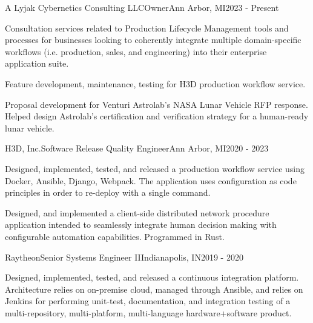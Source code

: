 



\begin{cventries}


  \cventry
  {A Lyjak Cybernetics Consulting LLC}{Owner}{Ann Arbor, MI}{2023 - Present}
  {
    \begin{cvitems}
    \item Consultation services related to Production Lifecycle Management tools and processes for
      businesses looking to coherently integrate multiple domain-specific workflows
      (i.e. production, sales, and engineering) into their enterprise application suite.
    \item Feature development, maintenance, testing for H3D production workflow service.
    \item Proposal development for Venturi Astrolab's NASA Lunar Vehicle RFP response. Helped design
      Astrolab's certification and verification strategy for a human-ready lunar vehicle.
    \end{cvitems}
  }

  \cventry
  {H3D, Inc.}{Software Release Quality Engineer}{Ann Arbor, MI}{2020 - 2023}
  {
    \begin{cvitems}
    \item Designed, implemented, tested, and released a production workflow service using
      Docker, Ansible, Django, Webpack. The application uses configuration as code principles in
      order to re-deploy with a single command.
    \item Designed, and implemented a client-side distributed network procedure application intended
      to seamlessly integrate human decision making with configurable automation
      capabilities. Programmed in Rust.
    \end{cvitems}
  }

  \cventry
  {Raytheon}{Senior Systems Engineer II}{Indianapolis, IN}{2019 - 2020}
  {
    \begin{cvitems}
    \item Designed, implemented, tested, and released a continuous integration
      platform. Architecture relies on on-premise cloud, managed through Ansible, and relies on
      Jenkins for performing unit-test, documentation, and integration testing of a
      multi-repository, multi-platform, multi-language hardware+software product.
    \end{cvitems}
  }


\end{cventries}
